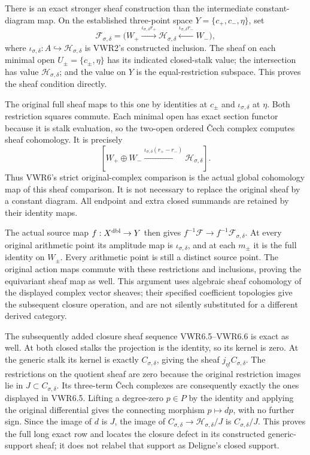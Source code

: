 There is an exact stronger sheaf construction than the intermediate
constant-diagram map. On the established three-point space
\(Y=\{c_+,c_-,\eta\}\), set \[
\mathcal F_{\sigma,\delta}
=\bigl(W_+\xrightarrow{\iota_{\sigma,\delta}r_+}
   \mathcal H_{\sigma,\delta}
   \xleftarrow{\iota_{\sigma,\delta}r_-}W_-\bigr),
\] where
\(\iota_{\sigma,\delta}:A\hookrightarrow\mathcal H_{\sigma,\delta}\) is
VWR2's constructed inclusion. The sheaf on each minimal open
\(U_\pm=\{c_\pm,\eta\}\) has its indicated closed-stalk value; the
intersection has value \(\mathcal H_{\sigma,\delta}\); and the value on
\(Y\) is the equal-restriction subspace. This proves the sheaf condition
directly.

The original full sheaf maps to this one by identities at \(c_\pm\) and
\(\iota_{\sigma,\delta}\) at \(\eta\). Both restriction squares commute.
Each minimal open has exact section functor because it is stalk
evaluation, so the two-open ordered Čech complex computes sheaf
cohomology. It is precisely \[
[W_+\oplus W_-\xrightarrow{\iota_{\sigma,\delta}(r_+-r_-)}
  \mathcal H_{\sigma,\delta}].
\] Thus VWR6's strict original-complex comparison is the actual global
cohomology map of this sheaf comparison. It is not necessary to replace
the original sheaf by a constant diagram. All endpoint and extra closed
summands are retained by their identity maps.

The actual source map \(f:X^{\rm dbl}\to Y\) then gives
\(f^{-1}\mathcal F\to f^{-1}\mathcal F_{\sigma,\delta}\). At every
original arithmetic point its amplitude map is
\(\iota_{\sigma,\delta}\), and at each \(m_\pm\) it is the full identity
on \(W_\pm\). Every arithmetic point is still a distinct source point.
The original action maps commute with these restrictions and inclusions,
proving the equivariant sheaf map as well. This argument uses algebraic
sheaf cohomology of the displayed complex vector sheaves; their
specified coefficient topologies give the subsequent closure operation,
and are not silently substituted for a different derived category.

The subsequently added closure sheaf sequence VWR6.5--VWR6.6 is exact as
well. At both closed stalks the projection is the identity, so its
kernel is zero. At the generic stalk its kernel is exactly
\(C_{\sigma,\delta}\), giving the sheaf \(j_{\eta!}C_{\sigma,\delta}\).
The restrictions on the quotient sheaf are zero because the original
restriction images lie in \(J\subset C_{\sigma,\delta}\). Its three-term
Čech complexes are consequently exactly the ones displayed in VWR6.5.
Lifting a degree-zero \(p\in P\) by the identity and applying the
original differential gives the connecting morphism \(p\mapsto dp\),
with no further sign. Since the image of \(d\) is \(J\), the image of
\(C_{\sigma,\delta}\to\mathcal H_{\sigma,\delta}/J\) is
\(C_{\sigma,\delta}/J\). This proves the full long exact row and locates
the closure defect in its constructed generic-support sheaf; it does not
relabel that support as Deligne's closed support.

